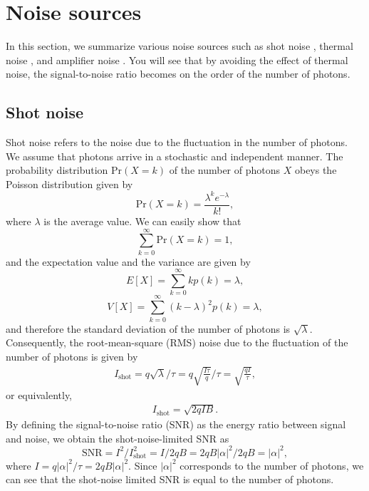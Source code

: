 \documentclass{book}
\begin{document}
\section{Noise sources}
In this section, we summarize various noise sources such as shot noise , thermal noise , and amplifier noise . You will see that by avoiding the effect of thermal noise, the signal-to-noise ratio becomes on the order of the number of photons. 

\subsection{Shot noise}
Shot noise refers to the noise due to the fluctuation in the number of photons. We assume that photons arrive in a stochastic and independent manner. The probability distribution $\mathrm{Pr}(X = k)$ of the number of photons $X$ obeys the Poisson distribution given by
\begin{equation}
	\mathrm{Pr}(X=k) = \frac{\lambda^k e^{-\lambda}}{k!},
\end{equation}
where $\lambda$ is the average value. We can easily show that 
\begin{equation}
	\sum_{k=0}^\infty \mathrm{Pr}(X=k) = 1,
\end{equation}
and the expectation value and the variance are given by
\begin{equation}
	E[X] = \sum_{k=0}^\infty kp(k) = \lambda,
\end{equation}
\begin{equation}
  	V[X] = \sum_{k=0}^\infty (k-\lambda)^2p(k) = \lambda,
\end{equation}
and therefore the standard deviation of the number of photons is $\sqrt \lambda$. Consequently, the root-mean-square (RMS) noise due to the fluctuation of the number of photons is given by
\begin{equation}
	\begin{aligned}
		I_{\mathrm{shot}} = q\sqrt{\lambda}/\tau = q\sqrt{\frac{I\tau}{q}}/\tau = \sqrt{\frac{qI}{\tau}},
	\end{aligned}
\end{equation}
or equivalently,
\begin{equation}
	\begin{aligned}
		I_\mathrm{shot}=\sqrt{2qIB}.
	\end{aligned}
\end{equation}
By defining the signal-to-noise ratio (SNR) as the energy ratio between signal and noise, we obtain the shot-noise-limited SNR as
\begin{equation}
  \mathrm{SNR} = I^2 / I_\mathrm{shot}^2 = I/2qB = 2qB|\alpha |^2/2qB = |\alpha|^2,
\end{equation}
where $I=q|\alpha|^2/\tau = 2qB|\alpha|^2$. Since $|\alpha|^2$ corresponds to the number of photons, we can see that the shot-noise limited SNR is equal to the number of photons.
\end{document}
